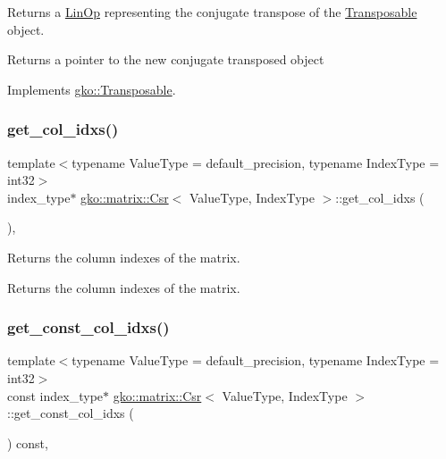 Returns a \hyperlink{classgko_1_1LinOp}{Lin\+Op} representing the conjugate transpose of the \hyperlink{classgko_1_1Transposable}{Transposable} object. 

\begin{DoxyReturn}{Returns}
a pointer to the new conjugate transposed object 
\end{DoxyReturn}


Implements \hyperlink{classgko_1_1Transposable_ab41b669288740cf2a6f7bf76e875b077}{gko\+::\+Transposable}.

\mbox{\label{classgko_1_1matrix_1_1Csr_a81c6294177a1be4873804c8a85a9fc64}} 
\subsubsection{\texorpdfstring{get\+\_\+col\+\_\+idxs()}{get\_col\_idxs()}}
{\footnotesize\ttfamily template$<$typename Value\+Type = default\+\_\+precision, typename Index\+Type = int32$>$ \\
index\+\_\+type$\ast$ \hyperlink{classgko_1_1matrix_1_1Csr}{gko\+::matrix\+::\+Csr}$<$ Value\+Type, Index\+Type $>$\+::get\+\_\+col\+\_\+idxs (\begin{DoxyParamCaption}{ }\end{DoxyParamCaption})\hspace{0.3cm}{\ttfamily [inline]}, {\ttfamily [noexcept]}}



Returns the column indexes of the matrix. 

\begin{DoxyReturn}{Returns}
the column indexes of the matrix. 
\end{DoxyReturn}
\mbox{\label{classgko_1_1matrix_1_1Csr_ac9d640d26449e0ee46c7cb2b80100d65}} 
\subsubsection{\texorpdfstring{get\+\_\+const\+\_\+col\+\_\+idxs()}{get\_const\_col\_idxs()}}
{\footnotesize\ttfamily template$<$typename Value\+Type = default\+\_\+precision, typename Index\+Type = int32$>$ \\
const index\+\_\+type$\ast$ \hyperlink{classgko_1_1matrix_1_1Csr}{gko\+::matrix\+::\+Csr}$<$ Value\+Type, Index\+Type $>$\+::get\+\_\+const\+\_\+col\+\_\+idxs (\begin{DoxyParamCaption}{ }\end{DoxyParamCaption}) const\hspace{0.3cm}{\ttfamily [inline]}, {\ttfamily [noexcept]}}



